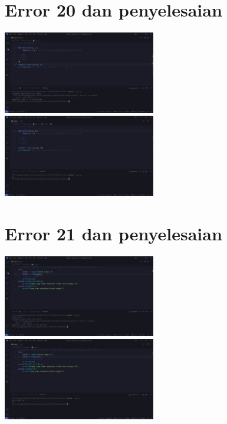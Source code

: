 \documentclass{article}
\begin{document}
\section{Error 20 dan penyelesaian}
\includegraphics[width=0.5\textwidth]{gambar/29_error.png}
\includegraphics[width=0.5\textwidth]{gambar/29_pengananan.png}

\section{Error 21 dan penyelesaian}
\includegraphics[width=0.5\textwidth]{gambar/30_error.png}
\includegraphics[width=0.5\textwidth]{gambar/30_pengananan.png}
\end{document}
